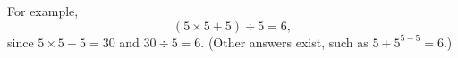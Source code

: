 For example,
\[\boxed{(5\times5+5)\div5=6},\]
since $5\times5+5=30$ and $30\div5=6$. (Other answers exist, such as $5+5^{5-5}=6$.)
